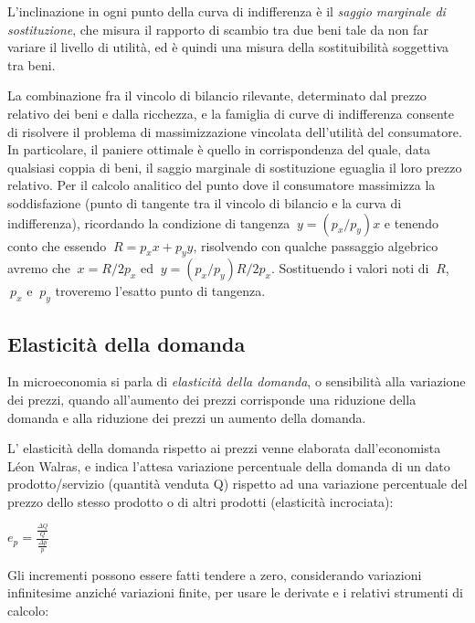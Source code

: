L'inclinazione in ogni punto della curva di indifferenza è il 
\emph{saggio marginale di sostituzione}, che misura il rapporto di scambio tra 
due beni tale da non far variare il livello di utilità, ed è quindi una misura 
della sostituibilità soggettiva tra beni.

La combinazione fra il vincolo di bilancio rilevante, determinato dal prezzo 
relativo dei beni e dalla ricchezza, e la famiglia di curve di indifferenza 
consente di risolvere il problema di massimizzazione vincolata dell'utilità del 
consumatore. In particolare, il paniere ottimale è quello in corrispondenza del 
quale, data qualsiasi coppia di beni, il saggio marginale di sostituzione 
eguaglia il loro prezzo relativo.    
Per il calcolo analitico del punto dove il consumatore massimizza la 
soddisfazione (punto di tangente tra il vincolo di bilancio e la curva di 
indifferenza), ricordando la condizione di tangenza \(\ y=(p_x/p_y)x\) 
e tenendo conto che essendo \(\ R=p_xx+p_yy\), risolvendo con qualche 
passaggio algebrico avremo che \(\ x=R/2p_x\) ed \(\ 
y=(p_x/p_y)R/2p_x\). Sostituendo i valori noti di \(\ R\), \(\ 
p_x\) e \(\ p_y\) troveremo l'esatto punto di tangenza. 


\subsection{Elasticità della domanda}

In microeconomia si parla di \emph{elasticità della domanda}, o 
sensibilità alla variazione dei prezzi, 
quando all'aumento dei prezzi corrisponde una riduzione della domanda e alla 
riduzione dei prezzi un aumento della domanda.

L' elasticità della domanda rispetto ai prezzi venne elaborata 
dall'economista Léon Walras, e indica l'attesa variazione percentuale della 
domanda di un dato prodotto/servizio (quantità venduta Q) rispetto ad una 
variazione percentuale del prezzo dello stesso prodotto o di altri prodotti 
(elasticità incrociata):

\( e_p = \frac {\frac {\Delta Q} {Q} } { \frac {\Delta p} {p}}\)

Gli incrementi possono essere fatti tendere a zero, considerando variazioni 
infinitesime anziché variazioni finite, per usare le derivate e i relativi 
strumenti di calcolo:

